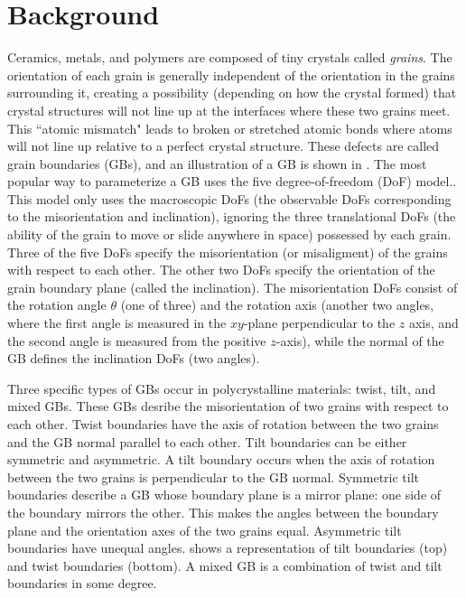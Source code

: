 \documentclass[12pt]{report}
\begin{document}
\section{Background\label{intro:background}}
Ceramics, metals, and polymers are composed of tiny crystals called \emph{grains}.  The orientation of each grain is generally independent of the orientation in the grains surrounding it, creating a possibility (depending on how the crystal formed\cite{callister2003}) that crystal structures will not line up at the interfaces where these two grains meet.  This ``atomic mismatch"\cite{callister2003} leads to broken or stretched atomic bonds where atoms will not line up relative to a perfect crystal structure.  These defects are called grain boundaries (GBs), and an illustration of a GB is shown in . The most popular way to parameterize a GB uses the five degree-of-freedom (DoF) model.\cite{patala2013, lejcek2010, homer2015, bulatov2014, harbison2015, rohrer2011}.  This model only uses the macroscopic DoFs (the observable DoFs corresponding to the misorientation and inclination), ignoring the three translational DoFs (the ability of the grain to move or slide anywhere in space) possessed by each grain.  Three of the five DoFs specify the misorientation (or misaligment) of the grains with respect to each other.  The other two DoFs specify the orientation of the grain boundary plane (called the inclination).  The misorientation DoFs consist of the rotation angle $\theta$ (one of three) and the rotation axis (another two angles, where the first angle is measured in the $xy$-plane perpendicular to the $z$ axis, and the second angle is measured from the positive $z$-axis), while the normal of the GB defines the inclination DoFs (two angles).\cite{lejcek2010}

Three specific types of GBs occur in polycrystalline materials: twist, tilt, and mixed GBs.\cite{lejcek2010, rohrer2011}  These GBs desribe the misorientation of two grains with respect to each other.  Twist boundaries have the axis of rotation between the two grains and the GB normal parallel to each other. Tilt boundaries can be either symmetric and asymmetric.  A tilt boundary occurs when the axis of rotation between the two grains is perpendicular to the GB normal.  Symmetric tilt boundaries describe a GB whose boundary plane is a mirror plane: one side of the boundary mirrors the other.  This makes the angles between the boundary plane and the orientation axes of the two grains equal. Asymmetric tilt boundaries have unequal angles.   shows a representation of tilt boundaries (top) and twist boundaries (bottom).  A mixed GB is a combination of twist and tilt boundaries in some degree.
\end{document}
